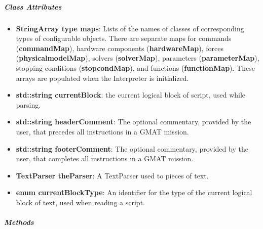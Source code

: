 \subparagraph{\textit{Class Attributes}}

\begin{itemize}
\item \textbf{StringArray type maps}: Lists of the names of classes of corresponding types of
configurable objects.  There are separate maps for commands (\textbf{commandMap}), hardware
components (\textbf{hardwareMap}), forces (\textbf{physicalmodelMap}), solvers (\textbf{solverMap}),
parameters (\textbf{parameterMap}), stopping conditions (\textbf{stopcondMap}), and
functions (\textbf{functionMap}).  These arrays are populated when the Interpreter is initialized.
\item \textbf{std::string currentBlock}: the current logical block of script, used while parsing.
\item \textbf{std::string headerComment}: The optional commentary, provided by the user, that
precedes all instructions in a GMAT mission.
\item \textbf{std::string footerComment}: The optional commentary, provided by the user, that
completes all instructions in a GMAT mission.
\item\textbf{TextParser theParser}: A TextParser used to pieces of text.
\item \textbf{enum currentBlockType}: An identifier for the type of the current logical block of
text, used when reading a script.
\end{itemize}

\subparagraph{\textit{Methods}}

